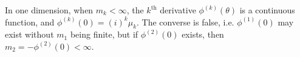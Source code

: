 In one dimension, when $m_k < \infty$, the $k^{\text{th}}$ derivative $\phi^{(k)}(\theta)$ is a continuous function, and $\phi^{(k)}(0) = (i)^k \mu_k$. The converse is false, i.e. $\phi^{(1)}(0)$ may exist without $m_1$ being finite, but if $\phi^{(2)}(0)$ exists, then $m_2 = -\phi^{(2)}(0) < \infty$.